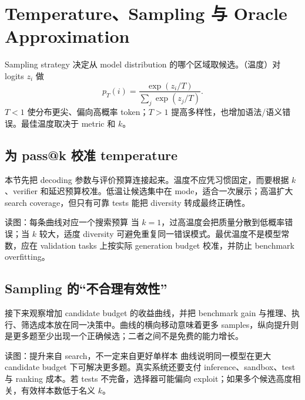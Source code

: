 \section{Temperature、Sampling 与 Oracle Approximation}

Sampling strategy 决定从 model distribution 的哪个区域取候选。（温度）对 logits $z_i$ 做
\[
p_T(i)=\frac{\exp(z_i/T)}{\sum_j\exp(z_j/T)}.
\]
$T<1$ 使分布更尖、偏向高概率 token；$T>1$ 提高多样性，也增加语法/语义错误。最佳温度取决于 metric 和 $k$。

\subsection{为 pass@k 校准 temperature}

本节先把 decoding 参数与评价预算连接起来。温度不应凭习惯固定，而要根据 $k$、verifier 和延迟预算校准。低温让候选集中在 mode，适合一次展示；高温扩大 search coverage，但只有可靠 tests 能把 diversity 转成最终正确性。


\begin{knowledgebox}{读图：每条曲线对应一个搜索预算}
当 $k=1$，过高温度会把质量分散到低概率错误；当 $k$ 较大，适度 diversity 可避免重复同一错误模式。最优温度不是模型常数，应在 validation tasks 上按实际 generation budget 校准，并防止 benchmark overfitting。
\end{knowledgebox}

\subsection{Sampling 的“不合理有效性”}

接下来观察增加 candidate budget 的收益曲线，并把 benchmark gain 与推理、执行、筛选成本放在同一决策中。曲线的横向移动意味着更多 samples，纵向提升则是更多题至少出现一个正确候选；二者之间不是免费的能力增长。


\begin{knowledgebox}{读图：提升来自 search，不一定来自更好单样本}
曲线说明同一模型在更大 candidate budget 下可解决更多题。真实系统还要支付 inference、sandbox、test 与 ranking 成本。若 tests 不完备，选择器可能偏向 exploit；如果多个候选高度相关，有效样本数低于名义 $k$。
\end{knowledgebox}

